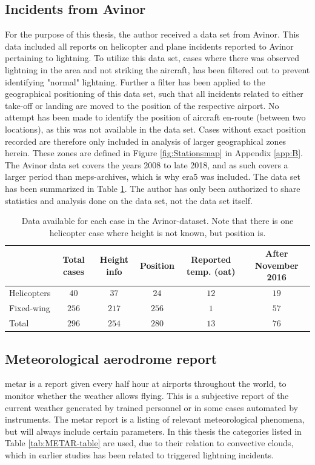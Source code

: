 \subsection{Incidents from Avinor}\label{sec:avinordata}
For the purpose of this thesis, the author received a data set from Avinor. This data included all reports on helicopter and plane incidents reported to Avinor pertaining to lightning. To utilize this data set, cases where there was observed lightning in the area and not striking the aircraft, has been filtered out to prevent identifying "normal" lightning. Further a filter has been applied to the geographical positioning of this data set, such that all incidents related to either take-off or landing are moved to the position of the respective airport. No attempt has been made to identify the position of aircraft en-route (between two locations), as this was not available in the data set. Cases without exact position recorded are therefore only included in analysis of larger geographical zones herein. These zones are defined in Figure \ref{fig:Stationsmap} in Appendix \ref{app:B}. The Avinor data set covers the years 2008 to late 2018, and as such covers a larger period than \acrshort{meps}-archives, which is why \acrshort{era5} was included. The data set has been summarized in Table \ref{tab:avinor}. The author has only been authorized to share statistics and analysis done on the data set, not the data set itself. 

\begin{table}
    \begin{tabular}{ l|c|c|c|c|c} 
    		&Total cases & Height info & Position & Reported temp. (\acrshort{oat}) & After November 2016\\
     		\hline
     		Helicopters &$40$ & $37$ & $24$ & $12$&$19$\\
     		Fixed-wing &$256$ & $217$ & $256$ & $1$&$57$\\ 
     		\hline
     		Total &$296$ &$254$ & $280$ & $13$&$76$\\ 
     		\hline
    \end{tabular}
    \caption{Data available for each case in the Avinor-dataset. Note that there is one helicopter case where height is not known, but position is. }
    \label{tab:avinor}
\end{table}

\subsection{Meteorological aerodrome report}\label{sec:metar}
\acrfull{metar} is a report given every half hour at airports throughout the world, to monitor whether the weather allows flying. This is a subjective report of the current weather generated by trained personnel or in some cases automated by instruments. The \acrshort{metar} report is a listing of relevant meteorological phenomena, but will always include certain parameters.  In this thesis the categories listed in Table \ref{tab:METAR-table} are used, due to their relation to convective clouds, which in earlier studies has been related to triggered lightning incidents. 

